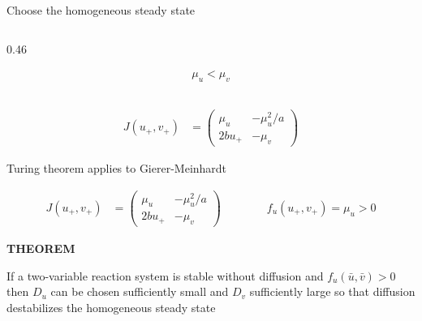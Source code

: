 \begin{frame}{Choose the homogeneous steady state}
\begin{columns}[T,onlytextwidth]
\begin{column}{0.46\textwidth}
      \vspace{-0.34cm}

      {\color{HydraWhite}\bfseries\fontsize{10.4}{13.2}\selectfont
      \begin{align*}
        \boxed{\mu_u<\mu_v}
      \end{align*}
      }

    \end{column}

  \end{columns}

  \vspace{-0.18cm}

  {\color{HydraWhite}\fontsize{9.6}{12.1}\selectfont
  \begin{align*}
    J(u_+,v_+)
    &=
    \begin{pmatrix}
      \mu_u&-\mu_u^2/a
      \\
      2bu_+&-\mu_v
    \end{pmatrix}
  \end{align*}
  }

\end{frame}


\begin{frame}{Turing theorem applies to Gierer-Meinhardt}

  \vspace{-0.18cm}

  {\color{HydraWhite}\fontsize{9.6}{12.1}\selectfont
  \begin{align*}
    J(u_+,v_+)
    &=
    \begin{pmatrix}
      \mu_u&-\mu_u^2/a
      \\
      2bu_+&-\mu_v
    \end{pmatrix}
    \qquad\qquad
    f_u(u_+,v_+)=\mu_u>0
  \end{align*}
  }

  \vspace{0.20cm}

  {\color{HydraGold}\bfseries\fontsize{7.8}{9.3}\selectfont
    THEOREM\par}

  \vspace{0.10cm}

  {\color{HydraWhite}\fontsize{8.4}{10.5}\selectfont
    If a two-variable reaction system is stable without diffusion and
    $f_u(\bar u,\bar v)>0$ then $D_u$ can be chosen sufficiently small
    and $D_v$ sufficiently large so that diffusion destabilizes the
    homogeneous steady state
  \par}

  \vspace{0.58cm}


\end{frame}


